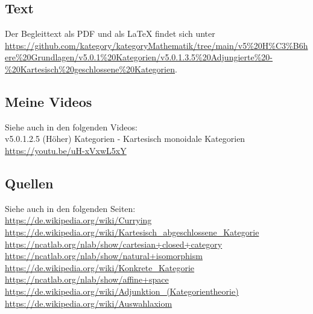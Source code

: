 \documentclass[a4paper]{amsart}
\theoremstyle{definition}
\begin{document}
\subsection*{Text}
Der Begleittext als PDF und als LaTeX findet sich unter
\url{https://github.com/kategory/kategoryMathematik/tree/main/v5%20H%C3%B6here%20Grundlagen/v5.0.1%20Kategorien/v5.0.1.3.5%20Adjungierte%20-%20Kartesisch%20geschlossene%20Kategorien}.

\subsection*{Meine Videos}
Siehe auch in den folgenden Videos:\\
v5.0.1.2.5 (Höher) Kategorien - Kartesisch monoidale Kategorien\\
\url{https://youtu.be/uH-xVxwL5xY}\\

\subsection*{Quellen}
Siehe auch in den folgenden Seiten:\\
\url{https://de.wikipedia.org/wiki/Currying}\\
\url{https://de.wikipedia.org/wiki/Kartesisch_abgeschlossene_Kategorie}\\
\url{https://ncatlab.org/nlab/show/cartesian+closed+category}\\
\url{https://ncatlab.org/nlab/show/natural+isomorphism}\\
\url{https://de.wikipedia.org/wiki/Konkrete_Kategorie}\\
\url{https://ncatlab.org/nlab/show/affine+space}\\
\url{https://de.wikipedia.org/wiki/Adjunktion_(Kategorientheorie)}\\
\url{https://de.wikipedia.org/wiki/Auswahlaxiom}
\end{document}
